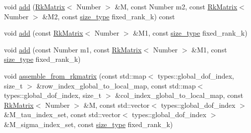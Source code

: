 \begin{DoxyCompactItemize}
\item 
void \hyperlink{classRkMatrix_aeba05e73aa670b1029c1720e56d10e81}{add} (\hyperlink{classRkMatrix}{Rk\+Matrix}$<$ Number $>$ \&M, const Number m2, const \hyperlink{classRkMatrix}{Rk\+Matrix}$<$ Number $>$ \&M2, const \hyperlink{classRkMatrix_add060bfc3a4cc77f858c3d6dd58cadd5}{size\+\_\+type} fixed\+\_\+rank\+\_\+k) const
\item 
void \hyperlink{classRkMatrix_a1f51eac54ddb43c0670a72da62bc1e55}{add} (const \hyperlink{classRkMatrix}{Rk\+Matrix}$<$ Number $>$ \&M1, const \hyperlink{classRkMatrix_add060bfc3a4cc77f858c3d6dd58cadd5}{size\+\_\+type} fixed\+\_\+rank\+\_\+k)
\item 
void \hyperlink{classRkMatrix_adb27c4eacf80d4e94c20ff96eaf5564d}{add} (const Number m1, const \hyperlink{classRkMatrix}{Rk\+Matrix}$<$ Number $>$ \&M1, const \hyperlink{classRkMatrix_add060bfc3a4cc77f858c3d6dd58cadd5}{size\+\_\+type} fixed\+\_\+rank\+\_\+k)
\item 
void \hyperlink{classRkMatrix_a9ff620f9f71181c794e129d71d76da7c}{assemble\+\_\+from\+\_\+rkmatrix} (const std\+::map$<$ types\+::global\+\_\+dof\+\_\+index, size\+\_\+t $>$ \&row\+\_\+index\+\_\+global\+\_\+to\+\_\+local\+\_\+map, const std\+::map$<$ types\+::global\+\_\+dof\+\_\+index, size\+\_\+t $>$ \&col\+\_\+index\+\_\+global\+\_\+to\+\_\+local\+\_\+map, const \hyperlink{classRkMatrix}{Rk\+Matrix}$<$ Number $>$ \&M, const std\+::vector$<$ types\+::global\+\_\+dof\+\_\+index $>$ \&M\+\_\+tau\+\_\+index\+\_\+set, const std\+::vector$<$ types\+::global\+\_\+dof\+\_\+index $>$ \&M\+\_\+sigma\+\_\+index\+\_\+set, const \hyperlink{classRkMatrix_add060bfc3a4cc77f858c3d6dd58cadd5}{size\+\_\+type} fixed\+\_\+rank\+\_\+k)
\end{DoxyCompactItemize}
